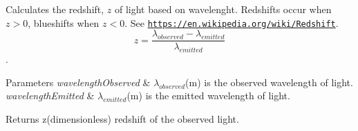 Calculates the redshift, $z$ of light based on wavelenght. Redshifts occur when $z > 0$, blueshifts when $z < 0$. See \href{https://en.wikipedia.org/wiki/Redshift}{\tt https\+://en.\+wikipedia.\+org/wiki/\+Redshift}. \[z=\frac{\lambda_{observed}-\lambda_{emitted}}{\lambda_{emitted}}\]. 


\begin{DoxyParams}{Parameters}
{\em wavelength\+Observed} & $\lambda_{observed}$(m) is the observed wavelength of light. \\
\hline
{\em wavelength\+Emitted} & $\lambda_{emitted}$(m) is the emitted wavelength of light. \\
\hline
\end{DoxyParams}
\begin{DoxyReturn}{Returns}
z(dimensionless) redshift of the observed light. 
\end{DoxyReturn}
